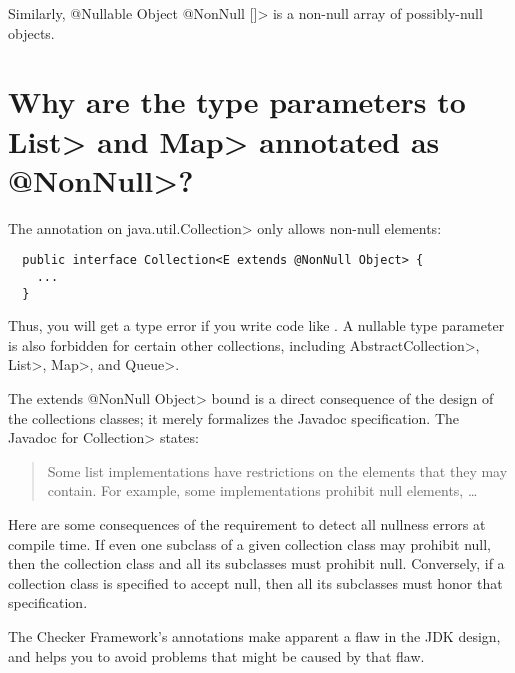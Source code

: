 Similarly,
\<@Nullable Object @NonNull []> is a non-null array of possibly-null
objects.


\section{Why are the type parameters to \<List> and \<Map> annotated as \<@NonNull>?\label{faq-list-map-nonnull-typeargs}}

The annotation on \<java.util.Collection> only allows non-null elements:

\begin{Verbatim}
  public interface Collection<E extends @NonNull Object> {
    ...
  }
\end{Verbatim}

\noindent
Thus, you will get a type error if you write code like
.
A nullable
type parameter is also forbidden for certain other collections, including
\<AbstractCollection>, \<List>, \<Map>, and \<Queue>.



The \<extends @NonNull Object> bound is a direct consequence of the design
of the collections classes; it merely formalizes the Javadoc specification.
The Javadoc for \<Collection> states:

\begin{quote}
  Some list implementations have restrictions on the elements that they may
  contain. For example, some implementations prohibit null elements, \ldots
\end{quote}

Here are some consequences of the requirement to detect all nullness errors
at compile time.  If even one subclass of a given collection class may
prohibit null, then the collection class and all its subclasses must
prohibit null.  Conversely, if a collection class is specified to accept
null, then all its subclasses must honor that specification.

The Checker Framework's annotations make apparent a flaw in the JDK
design, and helps you to avoid problems that might be caused by that flaw.


